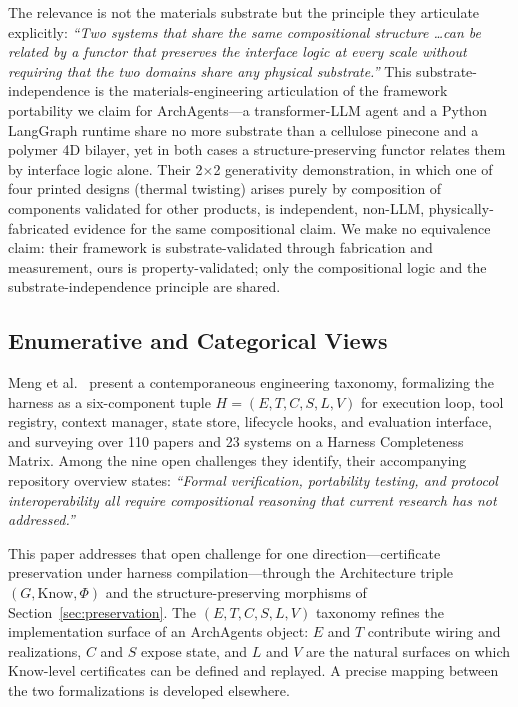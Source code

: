 The relevance is not the materials substrate but the principle they articulate explicitly: \textit{``Two systems that share the same compositional structure \ldots can be related by a functor that preserves the interface logic at every scale without requiring that the two domains share any physical substrate.''} This substrate-independence is the materials-engineering articulation of the framework portability we claim for ArchAgents---a transformer-LLM agent and a Python LangGraph runtime share no more substrate than a cellulose pinecone and a polymer 4D bilayer, yet in both cases a structure-preserving functor relates them by interface logic alone. Their 2$\times$2 generativity demonstration, in which one of four printed designs (thermal twisting) arises purely by composition of components validated for other products, is independent, non-LLM, physically-fabricated evidence for the same compositional claim. We make no equivalence claim: their framework is substrate-validated through fabrication and measurement, ours is property-validated; only the compositional logic and the substrate-independence principle are shared.

\subsection{Enumerative and Categorical Views}\label{sec:enumerative-and-categorical}

Meng et al.~\cite{meng2026agentharness} present a contemporaneous engineering taxonomy, formalizing the harness as a six-component tuple $H = (E, T, C, S, L, V)$ for execution loop, tool registry, context manager, state store, lifecycle hooks, and evaluation interface, and surveying over 110 papers and 23 systems on a Harness Completeness Matrix. Among the nine open challenges they identify, their accompanying repository overview states: \textit{``Formal verification, portability testing, and protocol interoperability all require compositional reasoning that current research has not addressed.''}

This paper addresses that open challenge for one direction---certificate preservation under harness compilation---through the Architecture triple $(G, \mathrm{Know}, \Phi)$ and the structure-preserving morphisms of Section~\ref{sec:preservation}. The $(E, T, C, S, L, V)$ taxonomy refines the implementation surface of an ArchAgents object: $E$ and $T$ contribute wiring and realizations, $C$ and $S$ expose state, and $L$ and $V$ are the natural surfaces on which $\mathrm{Know}$-level certificates can be defined and replayed. A precise mapping between the two formalizations is developed elsewhere.


